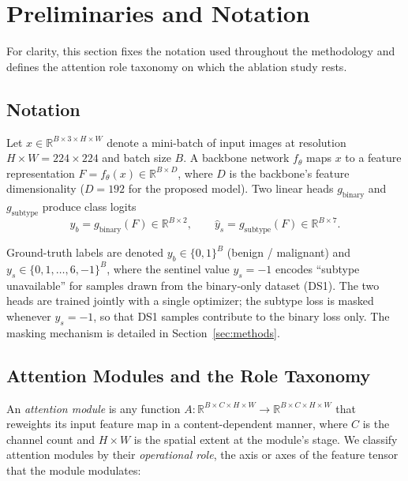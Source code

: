 \section{Preliminaries and Notation}\label{sec:prelim}

For clarity, this section fixes the notation used throughout the methodology
and defines the attention role taxonomy on which the ablation study rests.

\subsection{Notation}

Let $x \in \mathbb{R}^{B \times 3 \times H \times W}$ denote a mini-batch of
input images at resolution $H \times W = 224 \times 224$ and batch size $B$. A
backbone network $f_\theta$ maps $x$ to a feature representation
$F = f_\theta(x) \in \mathbb{R}^{B \times D}$, where $D$ is the backbone's
feature dimensionality ($D = 192$ for the proposed model). Two linear heads
$g_{\mathrm{binary}}$ and $g_{\mathrm{subtype}}$ produce class logits
\begin{equation}
  \hat{y}_b = g_{\mathrm{binary}}(F) \in \mathbb{R}^{B \times 2}, \qquad
  \hat{y}_s = g_{\mathrm{subtype}}(F) \in \mathbb{R}^{B \times 7}.
\end{equation}

Ground-truth labels are denoted $y_b \in \{0,1\}^{B}$ (benign / malignant) and
$y_s \in \{0,1,\dots,6,-1\}^{B}$, where the sentinel value $y_s = -1$ encodes
``subtype unavailable'' for samples drawn from the binary-only dataset (DS1).
The two heads are trained jointly with a single optimizer; the subtype loss is
masked whenever $y_s = -1$, so that DS1 samples contribute to the binary loss
only. The masking mechanism is detailed in Section~\ref{sec:methods}.

\subsection{Attention Modules and the Role Taxonomy}

An \emph{attention module} is any function
$A : \mathbb{R}^{B \times C \times H \times W} \rightarrow
\mathbb{R}^{B \times C \times H \times W}$ that reweights its input feature map
in a content-dependent manner, where $C$ is the channel count and
$H \times W$ is the spatial extent at the module's stage. We classify attention
modules by their \emph{operational role}, the axis or axes of the feature
tensor that the module modulates:

